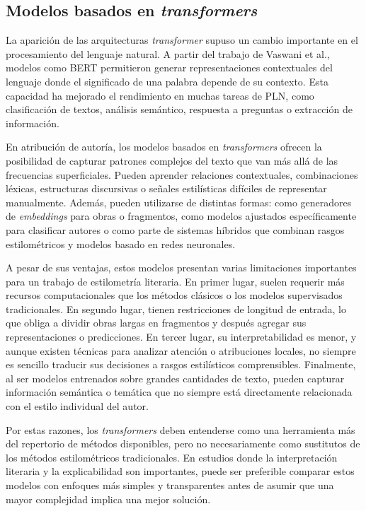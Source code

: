 \documentclass[IB]{TFUOC}%
\begin{document}
\subsection{Modelos basados en \textit{transformers}}

La aparición de las arquitecturas \textit{transformer} supuso un cambio importante en el procesamiento del lenguaje natural. A partir del trabajo de Vaswani et al.\cite{vaswani2017attention}, modelos como BERT\cite{devlin2019bert} permitieron generar representaciones contextuales del lenguaje donde el significado de una palabra depende de su contexto. Esta capacidad ha mejorado el rendimiento en muchas tareas de PLN, como clasificación de textos, análisis semántico, respuesta a preguntas o extracción de información.

En atribución de autoría, los modelos basados en \textit{transformers} ofrecen la posibilidad de capturar patrones complejos del texto que van más allá de las frecuencias superficiales. Pueden aprender relaciones contextuales, combinaciones léxicas, estructuras discursivas o señales estilísticas difíciles de representar manualmente. Además, pueden utilizarse de distintas formas: como generadores de \textit{embeddings} para obras o fragmentos, como modelos ajustados específicamente para clasificar autores o como parte de sistemas híbridos que combinan rasgos estilométricos y modelos basado en redes neuronales.

A pesar de sus ventajas, estos modelos presentan varias limitaciones importantes para un trabajo de estilometría literaria. En primer lugar, suelen requerir más recursos computacionales que los métodos clásicos o los modelos supervisados tradicionales. En segundo lugar, tienen restricciones de longitud de entrada, lo que obliga a dividir obras largas en fragmentos y después agregar sus representaciones o predicciones. En tercer lugar, su interpretabilidad es menor, y aunque existen técnicas para analizar atención o atribuciones locales, no siempre es sencillo traducir sus decisiones a rasgos estilísticos comprensibles. Finalmente, al ser modelos entrenados sobre grandes cantidades de texto, pueden capturar información semántica o temática que no siempre está directamente relacionada con el estilo individual del autor.

Por estas razones, los \textit{transformers} deben entenderse como una herramienta más del repertorio de métodos disponibles, pero no necesariamente como sustitutos de los métodos estilométricos tradicionales. En estudios donde la interpretación literaria y la explicabilidad son importantes, puede ser preferible comparar estos modelos con enfoques más simples y transparentes antes de asumir que una mayor complejidad implica una mejor solución.
\end{document}
